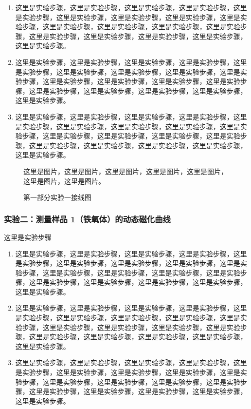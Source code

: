 \documentclass[UTF8]{article}
\theoremstyle{MyLineTheoremStyle} %
\theoremstyle{MyBlockTheoremStyle} %
\theoremstyle{MySubsubsectionStyle} %
\begin{document}
\begin{enumerate}
\item 这里是实验步骤，这里是实验步骤，这里是实验步骤，这里是实验步骤，这里是实验步骤，这里是实验步骤，这里是实验步骤，这里是实验步骤，这里是实验步骤，这里是实验步骤，这里是实验步骤，这里是实验步骤，这里是实验步骤，这里是实验步骤，这里是实验步骤，这里是实验步骤，这里是实验步骤，这里是实验步骤。
\item 这里是实验步骤，这里是实验步骤，这里是实验步骤，这里是实验步骤，这里是实验步骤，这里是实验步骤，这里是实验步骤，这里是实验步骤，这里是实验步骤，这里是实验步骤，这里是实验步骤，这里是实验步骤，这里是实验步骤，这里是实验步骤，这里是实验步骤，这里是实验步骤，这里是实验步骤，这里是实验步骤。
\item 这里是实验步骤，这里是实验步骤，这里是实验步骤，这里是实验步骤，这里是实验步骤，这里是实验步骤，这里是实验步骤，这里是实验步骤，这里是实验步骤，这里是实验步骤，这里是实验步骤，这里是实验步骤，这里是实验步骤，这里是实验步骤，这里是实验步骤，这里是实验步骤，这里是实验步骤，这里是实验步骤。
\end{enumerate}

\begin{figure}[H]\centering
    这里是图片，这里是图片，这里是图片，这里是图片，这里是图片，这里是图片，这里是图片。
\caption{第一部分实验一接线图}\label{第一部分实验一接线图}
\end{figure}

\subsubsection{实验二：测量样品 1（铁氧体）的动态磁化曲线}

这里是实验步骤

\begin{enumerate}
\item 这里是实验步骤，这里是实验步骤，这里是实验步骤，这里是实验步骤，这里是实验步骤，这里是实验步骤，这里是实验步骤，这里是实验步骤，这里是实验步骤，这里是实验步骤，这里是实验步骤，这里是实验步骤，这里是实验步骤，这里是实验步骤，这里是实验步骤，这里是实验步骤，这里是实验步骤，这里是实验步骤。
\item 这里是实验步骤，这里是实验步骤，这里是实验步骤，这里是实验步骤，这里是实验步骤，这里是实验步骤，这里是实验步骤，这里是实验步骤，这里是实验步骤，这里是实验步骤，这里是实验步骤，这里是实验步骤，这里是实验步骤，这里是实验步骤，这里是实验步骤，这里是实验步骤，这里是实验步骤，这里是实验步骤。
\item 这里是实验步骤，这里是实验步骤，这里是实验步骤，这里是实验步骤，这里是实验步骤，这里是实验步骤，这里是实验步骤，这里是实验步骤，这里是实验步骤，这里是实验步骤，这里是实验步骤，这里是实验步骤，这里是实验步骤，这里是实验步骤，这里是实验步骤，这里是实验步骤，这里是实验步骤，这里是实验步骤。
\end{enumerate}
\end{document}
